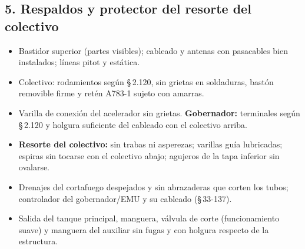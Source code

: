 \subsection*{5. Respaldos y protector del resorte del colectivo}
\begin{itemize}
\item Bastidor superior (partes visibles); cableado y antenas con pasacables bien instalados; líneas pitot y estática.
\item Colectivo: rodamientos según \S\,2.120, sin grietas en soldaduras, bastón removible firme y retén A783-1 sujeto con amarras.
\item Varilla de conexión del acelerador sin grietas. \textbf{Gobernador:} terminales según \S\,2.120 y holgura suficiente del cableado con el colectivo arriba.
\item \textbf{Resorte del colectivo:} sin trabas ni asperezas; varillas guía lubricadas; espiras sin tocarse con el colectivo abajo; agujeros de la tapa inferior sin ovalarse.
\item Drenajes del cortafuego despejados y sin abrazaderas que corten los tubos; controlador del gobernador/EMU y su cableado (\S\,33-137).
\item Salida del tanque principal, manguera, válvula de corte (funcionamiento suave) y manguera del auxiliar sin fugas y con holgura respecto de la estructura.
\end{itemize}


